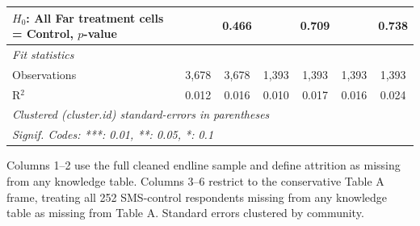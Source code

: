 \begin{tabular}{lcccccc}
   $H_0$: All Far treatment cells = Control, $p$-value   &              & 0.466                        &               & 0.709                         &               & 0.738\\  
   \midrule
   \emph{Fit statistics}\\
   Observations                                          & 3,678        & 3,678                        & 1,393         & 1,393                         & 1,393         & 1,393\\  
   R$^2$                                                 & 0.012        & 0.016                        & 0.010         & 0.017                         & 0.016         & 0.024\\  
   \midrule \midrule
   \multicolumn{7}{l}{\emph{Clustered (cluster.id) standard-errors in parentheses}}\\
   \multicolumn{7}{l}{\emph{Signif. Codes: ***: 0.01, **: 0.05, *: 0.1}}\\
\end{tabular}
 
\par \raggedright 
Columns 1--2 use the full cleaned endline sample and define attrition as missing from any knowledge table. Columns 3--6 restrict to the conservative Table A frame, treating all 252 SMS-control respondents missing from any knowledge table as missing from Table A. Standard errors clustered by community.


